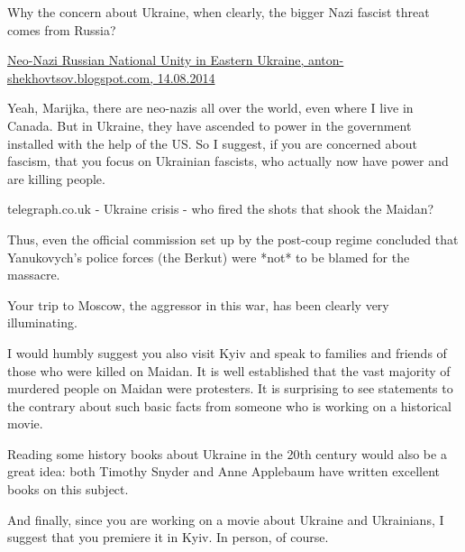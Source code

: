 \begin{itemize}
\begin{itemize}

Why the concern about Ukraine, when clearly, the bigger Nazi fascist threat
comes from Russia?

\href{http://anton-shekhovtsov.blogspot.com/2014/08/neo-nazi-russian-national-unity-in.html}{%
Neo-Nazi Russian National Unity in Eastern Ukraine, anton-shekhovtsov.blogspot.com, 14.08.2014%
}


Yeah, Marijka, there are neo-nazis all over the world, even where I live in
Canada. But in Ukraine, they have ascended to power in the government installed
with the help of the US. So I suggest, if you are concerned about fascism, that
you focus on Ukrainian fascists, who actually now have power and are killing
people.

\end{itemize} %


telegraph.co.uk - Ukraine crisis - who fired the shots that shook the Maidan?

\begin{itemize} %

Thus, even the official commission set up by the post-coup regime concluded
that Yanukovych's police forces (the Berkut) were *not* to be blamed for the
massacre.

\end{itemize} %


Your trip to Moscow, the aggressor in this war, has been clearly very
illuminating.

I would humbly suggest you also visit Kyiv and speak to families and friends of
those who were killed on Maidan. It is well established that the vast majority
of murdered people on Maidan were protesters. It is surprising to see
statements to the contrary about such basic facts from someone who is working
on a historical movie.

Reading some history books about Ukraine in the 20th century would also be a
great idea: both Timothy Snyder and Anne Applebaum have written excellent books
on this subject.

And finally, since you are working on a movie about Ukraine and Ukrainians, I
suggest that you premiere it in Kyiv. In person, of course.



\end{itemize}
